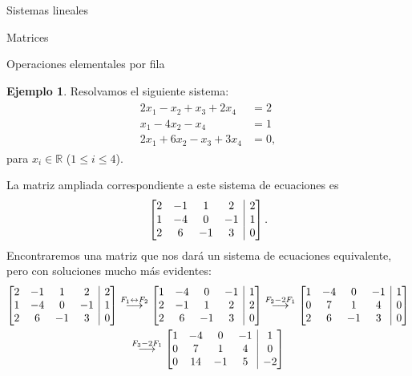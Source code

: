 \documentclass[a4paper,12pt,twoside,spanish,reqno]{amsbook}
\theoremstyle{definition}
\newtheorem{ejemplo}{Ejemplo}[section]
\theoremstyle{remark}
\newcommand{\R}{\mathbb R}
\begin{document}
\begin{chapter}{Sistemas lineales}
\begin{section}{Matrices}
\begin{subsection}{Operaciones elementales por fila}
                \begin{ejemplo}\label{ejemplo2.11}
                    Resolvamos el siguiente sistema:
                    \begin{align}\label{sist-eq-01}
                    \begin{split}
                    2x_1 - x_2 + x_3 + 2x_4 &= 2 \\
                    x_1 - 4x_2 -x_4 &=1 \\
                    2x_1 +6x_2 -x_3 +3x_4 &= 0,  
                    \end{split}
                    \end{align}
                    para  $x_i \in \R$ ($1 \le i \le 4$). 
                
                    
                    La matriz ampliada  correspondiente a este sistema de ecuaciones es 
                    $$
                    \left[\begin{array}{@{}*{4}{c}|c@{}} 
                     2& -1&1& 2&2 \\ 1&-4 &0&-1&1 \\ 2&6&-1&3&0 \end{array}\right].
                    $$
                    Encontraremos una matriz que nos dará un sistema de ecuaciones equivalente, pero con soluciones mucho más evidentes:
                    \begin{multline*}
                    \left[\begin{array}{@{}*{4}{c}|c@{}}  2& -1&1& 2&2 \\ 1&-4 &0&-1&1 \\ 2&6&-1&3&0 \end{array}\right]
                    \stackrel{F_1\leftrightarrow F_2}{\longrightarrow} 
                    \left[\begin{array}{@{}*{4}{c}|c@{}}  1&-4 &0&-1&1 \\ 2& -1&1& 2&2 \\ 2&6&-1&3&0 \end{array}\right]
                    \stackrel{F_2-2 F_1}{\longrightarrow} 
                    \left[\begin{array}{@{}*{4}{c}|c@{}}  1&-4 &0&-1&1 \\ 0& 7&1& 4&0 \\ 2&6&-1&3&0 \end{array}\right]
                    \\
                    \stackrel{F_3-2 F_1}{\longrightarrow} 
                    \left[\begin{array}{@{}*{4}{c}|c@{}}  1&-4 &0&-1&1 \\ 0& 7&1& 4&0 \\ 0&14&-1&5&-2 \end{array}\right] 

\end{multline*}
\end{ejemplo}
\end{subsection}
\end{section}
\end{chapter}
\end{document}
